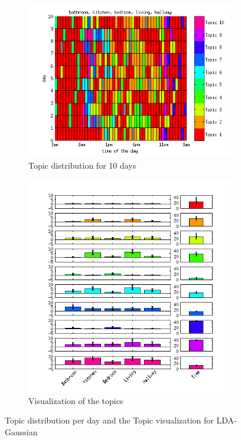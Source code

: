 \documentclass[11pt,a4paper]{article}
\begin{document}
\begin{figure}[h!]
 \centering
 \begin{subfigure}[b]{0.45\linewidth}
  \centering
  \includegraphics[width=\textwidth]{Pictures/GausDayHN2TS48k20.png}
  \caption{Topic distribution for 10 days}
 \end{subfigure}
 \begin{subfigure}[b]{0.45\linewidth}
  \centering
  \includegraphics[width=\textwidth]{Pictures/GausTopHN2TS48k20.png}
  \caption{Visualization of the topics}
  \label{fig:GausTopVisu48}
 \end{subfigure}
 \caption{Topic distribution per day and the Topic visualization for LDA-Gaussian}
 \label{fig:Gaus48}
\end{figure}
\end{document}
